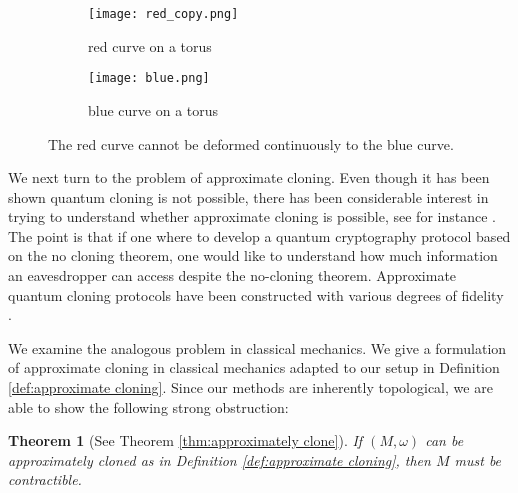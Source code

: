 \documentclass[jmp,amsmath,amssymb]{revtex4-1}
\theoremstyle{plain}
\newtheorem*{theorem*}{Theorem}
\begin{document}
\begin{figure}[h!]
     \centering
     \begin{subfigure}[b] {0.36\textwidth} 
         \centering
        \texttt{[image: red\_copy.png]}
         \caption{red curve on a torus}
         \label{red}
     \end{subfigure}
     \begin{subfigure}[b] {0.3\textwidth}
         \centering
         \texttt{[image: blue.png]}
         \caption{blue curve on a torus}
         \label{blue}
     \end{subfigure}
        \caption{The red curve cannot be deformed continuously to the blue curve.}
        \label{fig:three graphs}
\end{figure}

We next turn to the problem of approximate cloning. Even though it has been shown quantum cloning is not possible, there has been considerable interest in trying to understand whether approximate cloning is possible, see for instance \cite{optimal_quantum_cloning_machines,quantumcloning,optimal_universal_quantum_cloning,quantum_copying,quantum_cloning_machines,quantum_cloning_machine_for_equatorial_qubits,duan1997nonorthogonal,information_theoretic_limits,Probabilistic_Cloning_and_Identification_of_Linearly_Independent_Quantum_States}. The point is that if one where to develop a quantum cryptography protocol based on the no cloning theorem, one would like to understand how much information an eavesdropper can access despite the no-cloning theorem. Approximate quantum cloning protocols have been constructed with various degrees of fidelity \cite{duan1997nonorthogonal,optimal_quantum_cloning_machines,optimal_universal_quantum_cloning,Probabilistic_Cloning_and_Identification_of_Linearly_Independent_Quantum_States,quantum_copying,quantum_cloning_machine_for_equatorial_qubits,quantum_cloning_machines}.

We examine the analogous problem in classical mechanics. We give a formulation of approximate cloning in classical mechanics adapted to our setup in Definition \ref{def:approximate cloning}. Since our methods are inherently topological, we are able to show the following strong obstruction:

\begin{theorem*}[See Theorem \ref{thm:approximately clone}] If $(M,\omega)$ can be approximately cloned as in Definition \ref{def:approximate cloning}, then $M$ must be contractible.
\end{theorem*}
\end{document}
